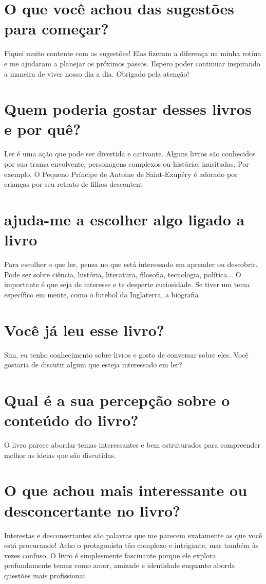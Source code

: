 \documentclass[11pt,a4paper]{article}
\begin{document}
\section{O que você achou das sugestões para começar?}
Fiquei muito contente com as sugestões! Elas fizeram a diferença na minha rotina e me ajudaram a planejar os próximos passos. Espero poder continuar inspirando a maneira de viver nosso dia a dia. Obrigado pela atenção!

\section{Quem poderia gostar desses livros e por quê?}
Ler é uma ação que pode ser divertida e cativante. Alguns livros são conhecidos por sua trama envolvente, personagens complexos ou histórias inusitadas. Por exemplo, O Pequeno Príncipe de Antoine de Saint-Exupéry é adorado por crianças por seu retrato de filhos descontent

\section{ajuda-me a escolher algo ligado a livro}
Para escolher o que ler, pensa no que está interessado em aprender ou descobrir. Pode ser sobre ciência, história, literatura, filosofia, tecnologia, política... O importante é que seja de interesse e te desperte curiosidade. Se tiver um tema específico em mente, como o futebol da Inglaterra, a biografia

\section{Você já leu esse livro?}
Sim, eu tenho conhecimento sobre livros e gosto de conversar sobre eles. Você gostaria de discutir algum que esteja interessado em ler?

\section{Qual é a sua percepção sobre o conteúdo do livro?}
O livro parece abordar temas interessantes e bem estruturados para compreender melhor as ideias que são discutidas.

\section{O que achou mais interessante ou desconcertante no livro?}
Interestas e desconsertantes são palavras que me parecem exatamente as que você está procurando! Acho o protagonista tão complexo e intrigante, mas também às vezes confuso. O livro é simplesmente fascinante porque ele explora profundamente temas como amor, amizade e identidade enquanto aborda questões mais profissionai
\end{document}
